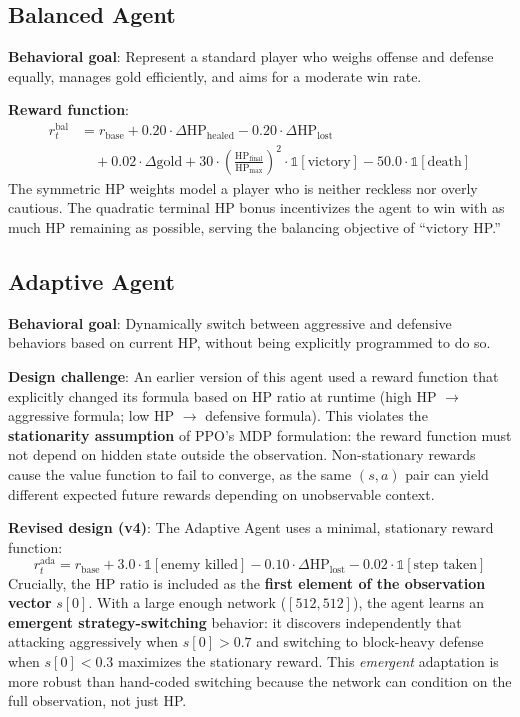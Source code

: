 \subsection{Balanced Agent}

\textbf{Behavioral goal}: Represent a standard player who weighs offense and defense equally, manages gold efficiently, and aims for a moderate win rate.

\textbf{Reward function}:
\begin{align}
r_t^{\text{bal}} &= r_{\text{base}} + 0.20 \cdot \Delta\text{HP}_{\text{healed}} - 0.20 \cdot \Delta\text{HP}_{\text{lost}} \nonumber \\
&\quad + 0.02 \cdot \Delta\text{gold} + 30 \cdot \left(\frac{\text{HP}_{\text{final}}}{\text{HP}_{\text{max}}}\right)^2 \cdot \mathbb{1}[\text{victory}] - 50.0 \cdot \mathbb{1}[\text{death}]
\end{align}
The symmetric HP weights model a player who is neither reckless nor overly cautious. The quadratic terminal HP bonus incentivizes the agent to win with as much HP remaining as possible, serving the balancing objective of ``victory HP.''

\subsection{Adaptive Agent}

\textbf{Behavioral goal}: Dynamically switch between aggressive and defensive behaviors based on current HP, without being explicitly programmed to do so.

\textbf{Design challenge}: An earlier version of this agent used a reward function that explicitly changed its formula based on HP ratio at runtime (high HP $\to$ aggressive formula; low HP $\to$ defensive formula). This violates the \textbf{stationarity assumption} of PPO's MDP formulation: the reward function must not depend on hidden state outside the observation. Non-stationary rewards cause the value function to fail to converge, as the same $(s, a)$ pair can yield different expected future rewards depending on unobservable context.

\textbf{Revised design (v4)}: The Adaptive Agent uses a minimal, stationary reward function:
\begin{equation}
r_t^{\text{ada}} = r_{\text{base}} + 3.0 \cdot \mathbb{1}[\text{enemy killed}] - 0.10 \cdot \Delta\text{HP}_{\text{lost}} - 0.02 \cdot \mathbb{1}[\text{step taken}]
\end{equation}
Crucially, the HP ratio is included as the \textbf{first element of the observation vector} $s[0]$. With a large enough network ($[512, 512]$), the agent learns an \textbf{emergent strategy-switching} behavior: it discovers independently that attacking aggressively when $s[0] > 0.7$ and switching to block-heavy defense when $s[0] < 0.3$ maximizes the stationary reward. This \textit{emergent} adaptation is more robust than hand-coded switching because the network can condition on the full observation, not just HP.

